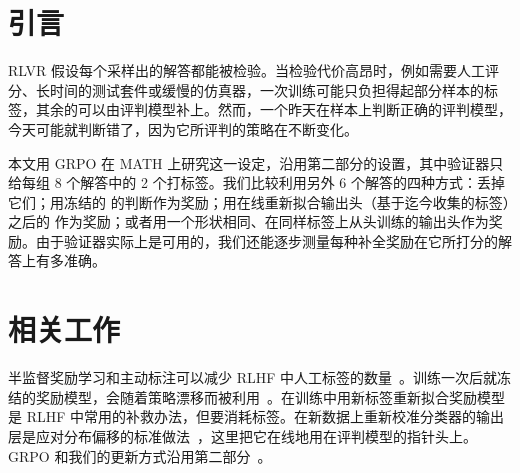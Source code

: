 
\section{引言}\label{sec:intro}

RLVR 假设每个采样出的解答都能被检验。当检验代价高昂时，例如需要人工评分、长时间的测试套件或缓慢的仿真器，一次训练可能只负担得起部分样本的标签，其余的可以由评判模型补上。然而，一个昨天在样本上判断正确的评判模型，今天可能就判断错了，因为它所评判的策略在不断变化。

本文用 GRPO 在 MATH 上研究这一设定，沿用第二部分的设置，其中验证器只给每组 8 个解答中的 2 个打标签。我们比较利用另外 6 个解答的四种方式：丢掉它们；用冻结的 \kev{} 的判断作为奖励；用在线重新拟合输出头（基于迄今收集的标签）之后的 \kev{} 作为奖励；或者用一个形状相同、在同样标签上从头训练的输出头作为奖励。由于验证器实际上是可用的，我们还能逐步测量每种补全奖励在它所打分的解答上有多准确。

\section{相关工作}\label{sec:related}

半监督奖励学习和主动标注可以减少 RLHF 中人工标签的数量~\cite{ouyang2022training}。训练一次后就冻结的奖励模型，会随着策略漂移而被利用~\cite{gao2023scaling}。在训练中用新标签重新拟合奖励模型是 RLHF 中常用的补救办法，但要消耗标签。在新数据上重新校准分类器的输出层是应对分布偏移的标准做法~\cite{guo2017calibration}，这里把它在线地用在评判模型的指针头上。GRPO 和我们的更新方式沿用第二部分~\cite{shao2024deepseekmath,liu2026tricks}。
